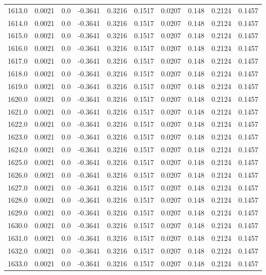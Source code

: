 \begin{longtable}{lrrrrrrrrr}
1613.0 & 0.0021 & 0.0 & -0.3641 & 0.3216 & 0.1517 & 0.0207 & 0.148 & 0.2124 & 0.1457 \\
1614.0 & 0.0021 & 0.0 & -0.3641 & 0.3216 & 0.1517 & 0.0207 & 0.148 & 0.2124 & 0.1457 \\
1615.0 & 0.0021 & 0.0 & -0.3641 & 0.3216 & 0.1517 & 0.0207 & 0.148 & 0.2124 & 0.1457 \\
1616.0 & 0.0021 & 0.0 & -0.3641 & 0.3216 & 0.1517 & 0.0207 & 0.148 & 0.2124 & 0.1457 \\
1617.0 & 0.0021 & 0.0 & -0.3641 & 0.3216 & 0.1517 & 0.0207 & 0.148 & 0.2124 & 0.1457 \\
1618.0 & 0.0021 & 0.0 & -0.3641 & 0.3216 & 0.1517 & 0.0207 & 0.148 & 0.2124 & 0.1457 \\
1619.0 & 0.0021 & 0.0 & -0.3641 & 0.3216 & 0.1517 & 0.0207 & 0.148 & 0.2124 & 0.1457 \\
1620.0 & 0.0021 & 0.0 & -0.3641 & 0.3216 & 0.1517 & 0.0207 & 0.148 & 0.2124 & 0.1457 \\
1621.0 & 0.0021 & 0.0 & -0.3641 & 0.3216 & 0.1517 & 0.0207 & 0.148 & 0.2124 & 0.1457 \\
1622.0 & 0.0021 & 0.0 & -0.3641 & 0.3216 & 0.1517 & 0.0207 & 0.148 & 0.2124 & 0.1457 \\
1623.0 & 0.0021 & 0.0 & -0.3641 & 0.3216 & 0.1517 & 0.0207 & 0.148 & 0.2124 & 0.1457 \\
1624.0 & 0.0021 & 0.0 & -0.3641 & 0.3216 & 0.1517 & 0.0207 & 0.148 & 0.2124 & 0.1457 \\
1625.0 & 0.0021 & 0.0 & -0.3641 & 0.3216 & 0.1517 & 0.0207 & 0.148 & 0.2124 & 0.1457 \\
1626.0 & 0.0021 & 0.0 & -0.3641 & 0.3216 & 0.1517 & 0.0207 & 0.148 & 0.2124 & 0.1457 \\
1627.0 & 0.0021 & 0.0 & -0.3641 & 0.3216 & 0.1517 & 0.0207 & 0.148 & 0.2124 & 0.1457 \\
1628.0 & 0.0021 & 0.0 & -0.3641 & 0.3216 & 0.1517 & 0.0207 & 0.148 & 0.2124 & 0.1457 \\
1629.0 & 0.0021 & 0.0 & -0.3641 & 0.3216 & 0.1517 & 0.0207 & 0.148 & 0.2124 & 0.1457 \\
1630.0 & 0.0021 & 0.0 & -0.3641 & 0.3216 & 0.1517 & 0.0207 & 0.148 & 0.2124 & 0.1457 \\
1631.0 & 0.0021 & 0.0 & -0.3641 & 0.3216 & 0.1517 & 0.0207 & 0.148 & 0.2124 & 0.1457 \\
1632.0 & 0.0021 & 0.0 & -0.3641 & 0.3216 & 0.1517 & 0.0207 & 0.148 & 0.2124 & 0.1457 \\
1633.0 & 0.0021 & 0.0 & -0.3641 & 0.3216 & 0.1517 & 0.0207 & 0.148 & 0.2124 & 0.1457 \\

\end{longtable}
